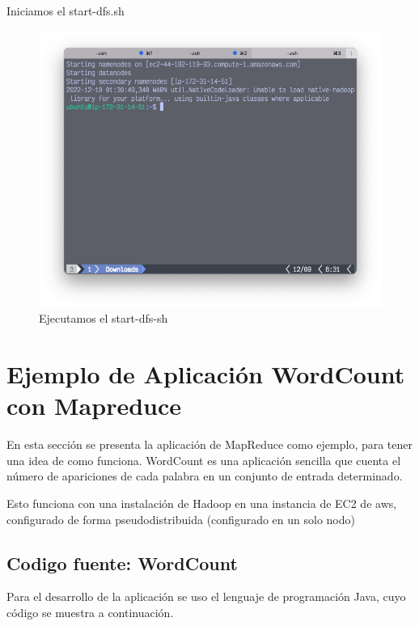 \clearpage 
Iniciamos el start-dfs.sh
\begin{figure}[h]
	\centering
	\includegraphics[scale=.35] {img/42-start-dfs-sh}
	\caption{Ejecutamos el start-dfs-sh}
	\label{fig:42}	
\end{figure}

\clearpage

\section{Ejemplo de Aplicación WordCount con Mapreduce}
\justify
En esta sección se presenta la aplicación de MapReduce como ejemplo, para tener una idea de como funciona.
WordCount es una aplicación sencilla que cuenta el número de apariciones de cada palabra en un conjunto de entrada determinado.

Esto funciona con una instalación de Hadoop en una instancia de EC2 de aws, configurado de forma pseudodistribuida (configurado en un solo nodo) 


 \subsection{Codigo fuente: WordCount}

 Para el desarrollo de la aplicación se uso el lenguaje de programación Java, cuyo código se muestra a continuación.

